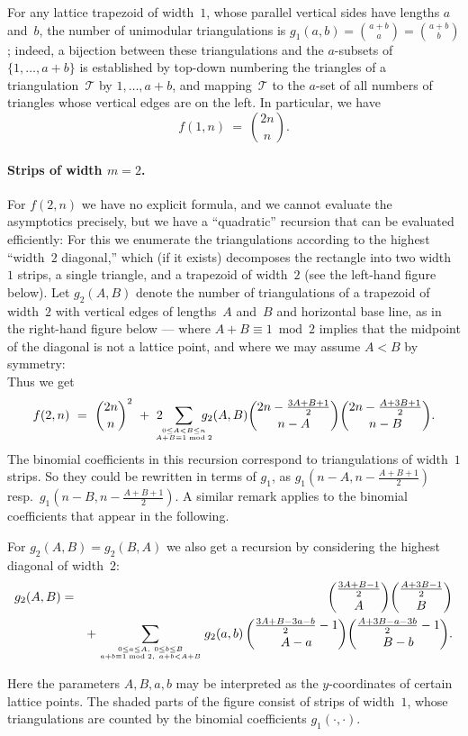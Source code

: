 For any lattice trapezoid of width~$1$, whose parallel vertical sides
have lengths $a$ and~$b$, the number of unimodular
triangulations is $g_1(a,b)=\binom{a+b}a= \binom{a+b}b$; indeed, a
bijection between these triangulations and the $a$-subsets of
$\{1,\dots,a+b\}$ is established by top-down numbering the triangles
of a triangulation~$\mathcal{T}$ by $1,\dots,a+b$, and
mapping~$\mathcal{T}$ to the $a$-set of all numbers of triangles whose
vertical edges are on the left. In particular, we have
\begin{equation}
  \label{eq:1n}
  f(1,n)\ =\ \binom{2n}{n}.  
\end{equation}

\paragraph{Strips of width \boldmath$m=2$. }

For $f(2,n)$ we have no explicit formula, and we cannot evaluate the
asymptotics precisely, but we have a ``quadratic'' recursion that can
be evaluated efficiently: For this we enumerate the triangulations
according to the highest ``width~$2$ diagonal,'' which (if it exists)
decomposes the rectangle into two width~$1$ strips, a single triangle,
and a trapezoid of width~$2$ (see the left-hand figure below).  Let
$g_2(A,B)$ denote the number of triangulations of a trapezoid of
width~$2$ with vertical edges of lengths~$A$ and~$B$ 
and horizontal base line, as in the right-hand figure below --- where
$A+B\equiv1\bmod2$ implies that the midpoint of the diagonal is not a
lattice point, and where we may assume $A<B$ by symmetry:
\[

\]
Thus we get 
\[
f(2,n)\ =\ \binom{2n}{n}^2\ +\ 2
\hspace{-3mm} \sum_{0\le A<B\le n\atop A+B\equiv1\bmod2}\hspace{-4mm}
g_2(A,B)
\binom{2n-\tfrac{3A+B+1}2}{n-A}
\binom{2n-\tfrac{A+3B+1}2}{n-B}.
\]
The binomial coefficients in this recursion
correspond to triangulations of width~$1$ strips. So they
could be rewritten in terms of $g_1$, as 
$g_1(n-A,n-\tfrac{A+B+1}2)$ resp.\ $g_1(n-B,n-\tfrac{A+B+1}2)$.
A similar remark applies to the binomial coefficients that
appear in the following.

For $g_2(A,B)=g_2(B,A)$ we also get a recursion by considering the
highest diagonal of width~$2$:
\begin{eqnarray*}
g_2(A,B) & = &\ 
\binom{\frac{3A+B-1}2}{A}
\binom{\frac{A+3B-1}2}{B}\\
&&+ 
\sum\limits_{0\le a\le A,\ 0\le b\le B \atop a+b\equiv1\bmod2,\ a+b<A+B}
g_2(a,b)\,
\binom{\frac{3A+B-3a-b}{2}-1}{A-a}
\binom{\frac{A+3B-a-3b}{2}-1}{B-b}.
\end{eqnarray*}
\begin{center}

\end{center}
Here the parameters $A,B,a,b$ may be interpreted as the $y$-coordinates
of certain lattice points. The shaded parts of the figure consist
of strips of width~$1$, whose triangulations are counted by
the binomial coefficients $g_1(\cdot,\cdot)$.


